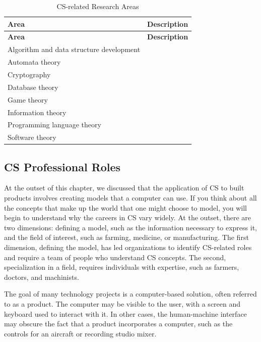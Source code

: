 \begin{longtable}[H]{p{.8in}|p{3.6in}}
	\caption{CS-related Research Areas}
	\label{tab:table1}\\
	\textbf{Area} & \textbf{Description}\\
	\hline
	\endfirsthead
	\textbf{Area} & \textbf{Description}\\
	\endhead
	\Tstrut Algorithm and data structure development & \\
	\hline
	\Tstrut Automata theory & \\
	\hline
	\Tstrut Cryptography & \\
	\hline
	\Tstrut Database theory & \\
	\hline
	\Tstrut Game theory & \\
	\hline
	\Tstrut Information theory & \\
	\hline
	\Tstrut Programming language theory & \\
	\hline
	\Tstrut Software theory & \\
	\bottomrule
\end{longtable}


\subsection{CS Professional Roles}

At the outset of this chapter, we discussed that the application of CS to built products involves creating models that a computer can use. If you think about all the concepts that make up the world that one might choose to model, you will begin to understand why the careers in CS vary widely. At the outset, there are two dimensions: defining a model, such as the information necessary to express it, and the field of interest, such as farming, medicine, or manufacturing. The first dimension, defining the model, has led organizations to identify CS-related roles and require a team of people who understand CS concepts. The second, specialization in a field, requires individuals with expertise, such as farmers, doctors, and machinists.

The goal of many technology projects is a computer-based solution, often referred to as a product. The computer may be visible to the user, with a screen and keyboard used to interact with it. In other cases, the human-machine interface may obscure the fact that a product incorporates a computer, such as the controls for an aircraft or recording studio mixer.

